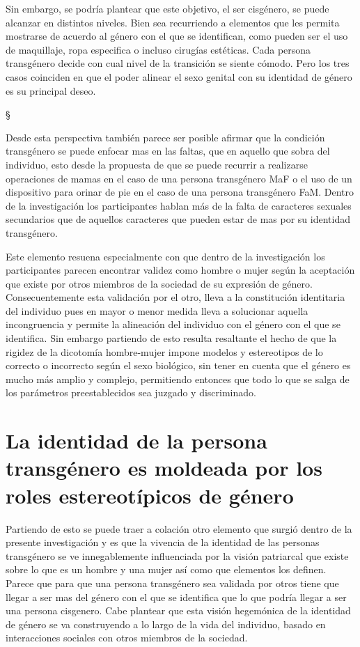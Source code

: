 Sin embargo, se podría plantear que este objetivo, el ser cisgénero, se puede
alcanzar en distintos niveles. Bien sea recurriendo a elementos que les permita
mostrarse de acuerdo al género con el que se identifican, como pueden ser el uso
de maquillaje, ropa especifica o incluso cirugías estéticas. Cada persona
transgénero decide con cual nivel de la transición se siente cómodo. Pero los
tres casos coinciden en que el poder alinear el sexo genital con su identidad de
género es su principal deseo.

\S

 Desde esta perspectiva también parece ser posible afirmar que la condición
 transgénero se puede enfocar mas en las faltas, que en aquello que sobra del
 individuo, esto desde la propuesta de que se puede recurrir a realizarse
 operaciones de mamas en el caso de una persona transgénero MaF o el uso de un
 dispositivo para orinar de pie en el caso de una persona transgénero FaM.
 Dentro de la investigación los participantes hablan más de la falta de
 caracteres sexuales secundarios que de aquellos caracteres que pueden estar de
 mas por su identidad transgénero.

Este elemento resuena especialmente con que dentro de la investigación los
participantes parecen encontrar validez como hombre o mujer según la aceptación
que existe por otros miembros de la sociedad de su expresión de género.
Consecuentemente esta validación por el otro, lleva a la constitución
identitaria del individuo pues en mayor o menor medida lleva a solucionar
aquella incongruencia y permite la alineación del individuo con el género con el
que se identifica. Sin embargo partiendo de esto resulta resaltante el hecho de
que la rigidez de la dicotomía hombre-mujer impone modelos y estereotipos de lo
correcto o incorrecto según el sexo biológico, sin tener en cuenta que el género
es mucho más amplio y complejo, permitiendo entonces que todo lo que se salga de
los parámetros preestablecidos sea juzgado y discriminado.

\section[La identidad es moldeada por el patriarcado]{La identidad de la persona
transgénero es moldeada por los roles estereotípicos de género}

Partiendo de esto se puede traer a colación otro elemento que surgió dentro de
la presente investigación y es que la vivencia de la identidad de las personas
transgénero se ve innegablemente influenciada por la visión patriarcal que
existe sobre lo que es un hombre y una mujer así como que elementos los definen.
Parece que para que una persona transgénero sea validada por otros tiene que
llegar a ser mas del género con el que se identifica que lo que podría llegar a
ser una persona cisgenero. Cabe plantear que esta visión hegemónica de la
identidad de género se va construyendo a lo largo de la vida del individuo,
basado en interacciones sociales con otros miembros de la sociedad.

